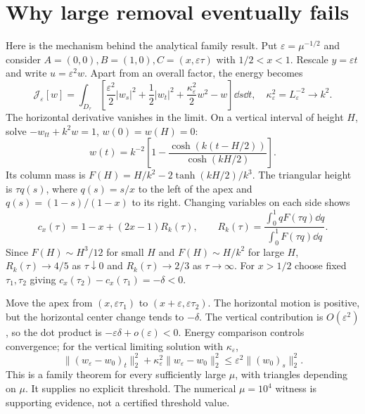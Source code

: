\documentclass[11pt,oneside,openany]{book}
\begin{document}
\section{Why large removal eventually fails}
Here is the mechanism behind the analytical family result.
Put $\varepsilon=\mu^{-1/2}$ and consider
$A=(0,0),B=(1,0),C=(x,\varepsilon\tau)$ with $1/2<x<1$.
Rescale $y=\varepsilon t$ and write $u=\varepsilon^2w$.
Apart from an overall factor, the energy becomes
\[
\mathcal J_\varepsilon[w]=
\int_{D_\tau}
\left[\frac{\varepsilon^2}{2}|w_s|^2+
\frac12|w_t|^2+\frac{\kappa_\varepsilon^2}{2}w^2-w\right]\dd s\dd t,
\quad \kappa_\varepsilon^2=L_\varepsilon^{-2}\to k^2.
\]
The horizontal derivative vanishes in the limit.
On a vertical interval of height $H$, solve
$-w_{tt}+k^2w=1$, $w(0)=w(H)=0$:
\[
w(t)=k^{-2}\left[1-
\frac{\cosh(k(t-H/2))}{\cosh(kH/2)}\right].
\]
Its column mass is
$F(H)=H/k^2-2\tanh(kH/2)/k^3$.
The triangular height is $\tau q(s)$, where $q(s)=s/x$ to the left
of the apex and $q(s)=(1-s)/(1-x)$ to its right.
Changing variables on each side shows
\[
c_x(\tau)=1-x+(2x-1)R_k(\tau),\qquad
R_k(\tau)=
\frac{\int_0^1qF(\tau q)\dd q}{\int_0^1F(\tau q)\dd q}.
\]
Since $F(H)\sim H^3/12$ for small $H$ and $F(H)\sim H/k^2$
for large $H$,
$R_k(\tau)\to4/5$ as $\tau\downarrow0$ and $R_k(\tau)\to2/3$
as $\tau\to\infty$.
For $x>1/2$ choose fixed $\tau_1,\tau_2$ giving
$c_x(\tau_2)-c_x(\tau_1)=-\delta<0$.

Move the apex from $(x,\varepsilon\tau_1)$ to
$(x+\varepsilon,\varepsilon\tau_2)$.
The horizontal motion is positive, but the horizontal center change
tends to $-\delta$. The vertical contribution is $O(\varepsilon^2)$,
so the dot product is $-\varepsilon\delta+o(\varepsilon)<0$.
Energy comparison controls convergence; for the vertical limiting
solution with $\kappa_\varepsilon$,
\[
\|(w_\varepsilon-w_0)_t\|_2^2+
\kappa_\varepsilon^2\|w_\varepsilon-w_0\|_2^2
\le\varepsilon^2\|(w_0)_s\|_2^2.
\]
This is a family theorem for every sufficiently large $\mu$,
with triangles depending on $\mu$. It supplies no explicit threshold.
The numerical $\mu=10^4$ witness is supporting evidence, not a
certified threshold value.
\end{document}
